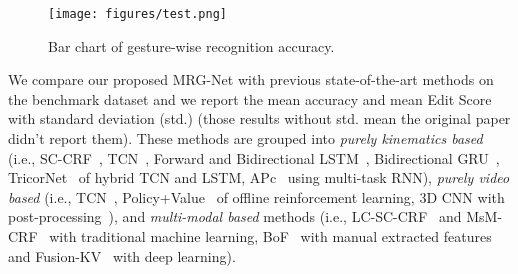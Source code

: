 \documentclass[letterpaper, 10 pt, conference]{ieeeconf}
\begin{document}
\begin{table}[t]
\begin{center}
\caption{Results of different methods on JIGSAWS Knot Typing dataset for gesture recognition.}\label{tab_knot}
\end{center}
\vspace{-4mm}
\end{table}

\begin{figure}[t]
\centering
\texttt{[image: figures/test.png]}
\vspace{-3mm}
\caption{Bar chart of gesture-wise recognition accuracy.}
\label{fig2}
\vspace{-6mm}
\end{figure}



We compare our proposed MRG-Net with previous state-of-the-art methods on the benchmark dataset and we report the mean accuracy and mean Edit Score with standard deviation (std.) (those results without std. mean the original paper didn't report them).
 These methods are grouped into \emph{purely kinematics based} (i.e., SC-CRF~\cite{ahmidi2017dataset}, TCN~\cite{lea2016temporal}, Forward and Bidirectional LSTM~\cite{dipietro2016recognizing}, Bidirectional GRU~\cite{dipietro2019segmenting}, TricorNet~\cite{ding2017tricornet} of hybrid TCN and LSTM, APc~\cite{van2020multi} using multi-task RNN), \emph{purely video based} (i.e., TCN~\cite{lea2016temporal}, Policy+Value~\cite{gao2020automatic} of offline reinforcement learning, 3D CNN with post-processing~\cite{funke2019using}), and \emph{multi-modal based} methods (i.e., LC-SC-CRF~\cite{lea2016learning} and MsM-CRF~\cite{ahmidi2017dataset} with traditional machine learning, BoF~\cite{ahmidi2017dataset} with manual extracted features and Fusion-KV~\cite{qin2020temporal} with deep learning).
\end{document}
